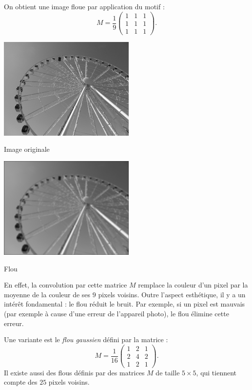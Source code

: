 \documentclass[11pt,class=report,crop=false]{standalone}
\begin{document}
On obtient une image floue par application du motif :
$$M = 
\frac19 \begin{pmatrix}
1&1&1\\
1&1&1\\
1&1&1
\end{pmatrix}.$$

\begin{center}
	\begin{minipage}{0.45\textwidth}\center
       \includegraphics[scale=\myscale,scale=0.7]{figures/image_flou_avant}
	
	Image originale
	\end{minipage}
	\begin{minipage}{0.45\textwidth}\center
	 \includegraphics[scale=\myscale,scale=0.7]{figures/image_flou_apres}
	
	Flou
    \end{minipage}	
\end{center}


En effet, la convolution par cette matrice $M$ remplace la couleur d'un pixel par la moyenne de la couleur de ses $9$ pixels voisins. 
Outre l'aspect esthétique, il y a un intérêt fondamental : le flou réduit le bruit. 
Par exemple, si un pixel est mauvais (par exemple à cause d'une erreur de l'appareil photo), le flou élimine cette erreur.

Une variante est le \emph{flou gaussien} défini par la matrice :
$$M = 
\frac{1}{16} \begin{pmatrix}
1&2&1\\
2&4&2\\
1&2&1
\end{pmatrix}.$$
Il existe aussi des flous définis par des matrices $M$ de taille $5 \times 5$, qui tiennent compte des $25$ pixels voisins.
\end{document}
